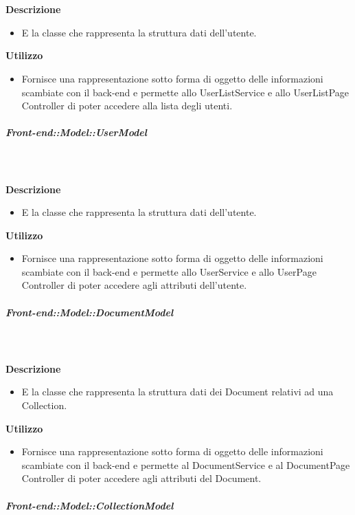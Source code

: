        \textbf{\\ \\ Descrizione} 
          \begin{itemize}
            \item[] E la classe che rappresenta la struttura dati dell'utente.
          \end{itemize}      
        \textbf{Utilizzo}  
          \begin{itemize}
            \item[] Fornisce una rappresentazione sotto forma di oggetto delle informazioni scambiate con il back-end e permette allo UserListService e allo UserListPage Controller di poter accedere alla lista degli utenti.
          \end{itemize}
      \subparagraph{Front-end::Model::UserModel}
        
        \textbf{\\ \\ Descrizione} 
          \begin{itemize}
            \item[] E la classe che rappresenta la struttura dati dell'utente.
          \end{itemize}      
        \textbf{Utilizzo}  
          \begin{itemize}
            \item[] Fornisce una rappresentazione sotto forma di oggetto delle informazioni scambiate con il back-end e permette allo UserService e allo UserPage Controller di poter accedere agli attributi dell'utente.
          \end{itemize}
      \subparagraph{Front-end::Model::DocumentModel}
        
        \textbf{\\ \\ Descrizione} 
          \begin{itemize}
            \item[] E la classe che rappresenta la struttura dati dei Document relativi ad una Collection.
          \end{itemize}      
        \textbf{Utilizzo}  
          \begin{itemize}
            \item[] Fornisce una rappresentazione sotto forma di oggetto delle informazioni scambiate con il back-end e permette al DocumentService e al DocumentPage Controller di poter accedere agli attributi del Document.
          \end{itemize}
      \subparagraph{Front-end::Model::CollectionModel}
        
